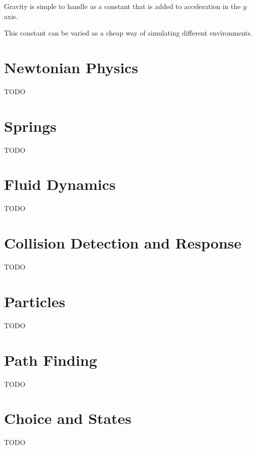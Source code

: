 \documentclass[a4paper]{article}
\begin{document}
Gravity is simple to handle as a constant that is added to acceleration in the
$y$ axis.

This constant can be varied as a cheap way of simulating different environments.

\section{Newtonian Physics}

TODO

\section{Springs}

TODO

\section{Fluid Dynamics}

TODO

\section{Collision Detection and Response}

TODO

\section{Particles}

TODO

\section{Path Finding}

TODO

\section{Choice and States}

TODO
\end{document}
